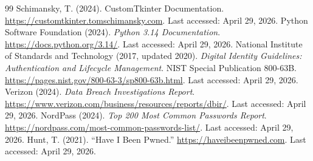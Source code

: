 \documentclass[english,12pt,twoside,a4paper]{report}
\begin{document}
\begin{thebibliography}{99}
 Schimansky, T. (2024). CustomTkinter Documentation. \url{https://customtkinter.tomschimansky.com}. Last accessed: April 29, 2026.
 Python Software Foundation (2024). \textit{Python 3.14 Documentation}. \url{https://docs.python.org/3.14/}. Last accessed: April 29, 2026.
 National Institute of Standards and Technology (2017, updated 2020). \textit{Digital Identity Guidelines: Authentication and Lifecycle Management}. NIST Special Publication 800-63B. \url{https://pages.nist.gov/800-63-3/sp800-63b.html}. Last accessed: April 29, 2026.
 Verizon (2024). \textit{Data Breach Investigations Report}. \url{https://www.verizon.com/business/resources/reports/dbir/}. Last accessed: April 29, 2026.
 NordPass (2024). \textit{Top 200 Most Common Passwords Report}. \url{https://nordpass.com/most-common-passwords-list/}. Last accessed: April 29, 2026.
 Hunt, T. (2021). ``Have I Been Pwned.'' \url{https://haveibeenpwned.com}. Last accessed: April 29, 2026.


\end{thebibliography}
\end{document}
